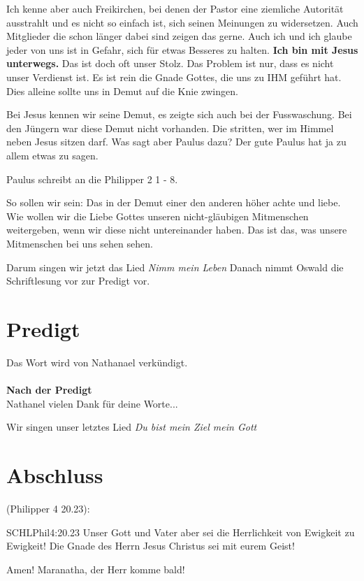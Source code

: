 Ich kenne aber auch Freikirchen, bei denen der Pastor eine ziemliche Autorität ausstrahlt und es nicht so einfach ist, sich seinen Meinungen zu widersetzen. Auch Mitglieder die schon länger \glqq dabei sind\grqq{} zeigen das gerne. Auch ich und ich glaube jeder von uns ist in Gefahr, sich für etwas Besseres zu halten. \textbf{Ich bin mit Jesus unterwegs.} Das ist doch oft unser Stolz. Das Problem ist nur, dass es nicht unser Verdienst ist. Es ist rein die Gnade Gottes, die uns zu IHM geführt hat. Dies alleine sollte uns in Demut auf die Knie zwingen.

Bei Jesus kennen wir seine Demut, es zeigte sich auch bei der Fusswaschung. Bei den Jüngern war diese Demut nicht vorhanden. Die stritten, wer im Himmel neben Jesus sitzen darf. Was sagt aber Paulus dazu? Der gute Paulus hat ja zu allem etwas zu sagen.

Paulus schreibt an die Philipper 2 1 - 8.

So sollen wir sein: Das in der Demut einer den anderen höher achte und liebe. Wie wollen wir die Liebe Gottes unseren nicht-gläubigen Mitmenschen weitergeben, wenn wir diese nicht untereinander haben. Das ist das, was unsere Mitmenschen bei uns sehen sehen.

Darum singen wir jetzt das Lied \textit{Nimm mein Leben}
Danach nimmt Oswald die Schriftlesung vor zur Predigt vor.

\section{Predigt}
Das Wort wird von Nathanael verkündigt.
\\
\\
\textbf{Nach der Predigt}\\
Nathanel vielen Dank für deine Worte...

Wir singen unser letztes Lied \textit{Du bist mein Ziel mein Gott}

\section{Abschluss}
(Philipper 4 20.23):
\begin{bibelbox}{SCHL}{Phil}{4:20.23}
Unser Gott und Vater aber sei die Herrlichkeit von Ewigkeit zu Ewigkeit!
Die Gnade des Herrn Jesus Christus sei mit eurem Geist!
\end{bibelbox}
Amen! Maranatha, der Herr komme bald!
